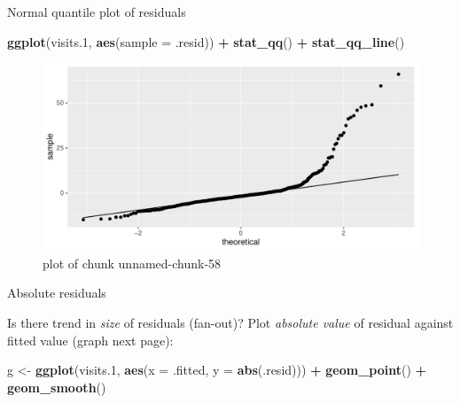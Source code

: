 \documentclass[ignorenonframetext,]{beamer}
\newenvironment{Shaded}{\begin{snugshade}}{\end{snugshade}}
\newcommand{\DataTypeTok}[1]{\textcolor[rgb]{0.13,0.29,0.53}{#1}}
\newcommand{\FloatTok}[1]{\textcolor[rgb]{0.00,0.00,0.81}{#1}}
\newcommand{\KeywordTok}[1]{\textcolor[rgb]{0.13,0.29,0.53}{\textbf{#1}}}
\newcommand{\NormalTok}[1]{#1}
\newcommand{\OperatorTok}[1]{\textcolor[rgb]{0.81,0.36,0.00}{\textbf{#1}}}
\newcommand{\StringTok}[1]{\textcolor[rgb]{0.31,0.60,0.02}{#1}}
\begin{document}
\begin{frame}[fragile]{Normal quantile plot of residuals}
\protect\hypertarget{normal-quantile-plot-of-residuals}{}

\begin{Shaded}
\begin{Highlighting}[]
\KeywordTok{ggplot}\NormalTok{(visits}\FloatTok{.1}\NormalTok{, }\KeywordTok{aes}\NormalTok{(}\DataTypeTok{sample =}\NormalTok{ .resid)) }\OperatorTok{+}\StringTok{ }\KeywordTok{stat_qq}\NormalTok{() }\OperatorTok{+}\StringTok{ }\KeywordTok{stat_qq_line}\NormalTok{()}
\end{Highlighting}
\end{Shaded}

\begin{figure}
\centering
\includegraphics{figure/unnamed-chunk-58-1.pdf}
\caption{plot of chunk unnamed-chunk-58}
\end{figure}

\end{frame}

\begin{frame}[fragile]{Absolute residuals}
\protect\hypertarget{absolute-residuals}{}

Is there trend in \emph{size} of residuals (fan-out)? Plot
\emph{absolute value} of residual against fitted value (graph next
page):

\begin{Shaded}
\begin{Highlighting}[]
\NormalTok{g <-}\StringTok{ }\KeywordTok{ggplot}\NormalTok{(visits}\FloatTok{.1}\NormalTok{, }\KeywordTok{aes}\NormalTok{(}\DataTypeTok{x =}\NormalTok{ .fitted, }\DataTypeTok{y =} \KeywordTok{abs}\NormalTok{(.resid))) }\OperatorTok{+}
\StringTok{  }\KeywordTok{geom_point}\NormalTok{() }\OperatorTok{+}\StringTok{ }\KeywordTok{geom_smooth}\NormalTok{()}
\end{Highlighting}
\end{Shaded}

\end{frame}
\end{document}
